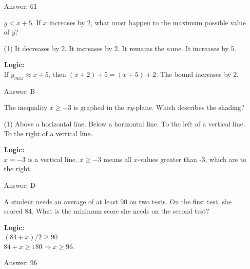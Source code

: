 \documentclass[11pt,paper=a4,answers]{exam}
\begin{document}
\begin{questions}
\begin{solution}
\vspace{15pt}
Answer: \colorbox{yellow!100}{61}
\end{solution}

\question
$y < x + 5$. If $x$ increases by 2, what must happen to the maximum possible value of $y$?
\begin{tasks}(1)
    \task It decreases by 2.
    \task It increases by 2.
    \task It remains the same.
    \task It increases by 5.
\end{tasks}

\begin{solution}
\textbf{Logic:} \\
If $y_{max} \approx x + 5$, then $(x+2) + 5 = (x+5) + 2$. The bound increases by 2.

\vspace{15pt}
Answer: \colorbox{yellow!100}{B}
\end{solution}

\question
The inequality $x \ge -3$ is graphed in the $xy$-plane. Which describes the shading?
\begin{tasks}(1)
    \task Above a horizontal line.
    \task Below a horizontal line.
    \task To the left of a vertical line.
    \task To the right of a vertical line.
\end{tasks}

\begin{solution}
\textbf{Logic:} \\
$x = -3$ is a vertical line. $x \ge -3$ means all $x$-values greater than -3, which are to the right.

\vspace{15pt}
Answer: \colorbox{yellow!100}{D}
\end{solution}

\question
A student needs an average of at least 90 on two tests. On the first test, she scored 84. What is the minimum score she needs on the second test?

\begin{solution}
\textbf{Logic:} \\
$(84 + x)/2 \ge 90$ \\
$84 + x \ge 180 \Rightarrow x \ge 96$.

\vspace{15pt}
Answer: \colorbox{yellow!100}{96}
\end{solution}


\end{questions}
\end{document}

